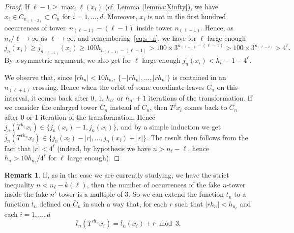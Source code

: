 \documentclass[10pt]{amsart}
\theoremstyle{definition}\newtheorem{defi}[theo]{Definition}\newtheorem{rema}[theo]{Remark}\newtheorem{exam}[theo]{Example}\newtheorem{exem}[theo]{Example}\newtheorem{nota}[theo]{Notation}
\begin{document}
\goodbreak
\begin{proof}
If $\ell-1\ge \max_i \ell(x_i)$ (cf. Lemma~\ref{lemma:Xinfty}), we have $x_i\in C_{n_{(\ell-2)}} \subset C_n$ for $i=1,\ldots,d$. Moreover, $x_i$ is not in the first hundred occurrences of tower~$n_{(\ell-1)}-(\ell-1)$ inside tower $n_{(\ell-1)}$. Hence, as $n_\ell/\ell\to\infty$ as $\ell\to\infty$, and remembering~\eqref{eq:s_n}, we have for $\ell$ large enough
\[
j_n(x_i) \ge j_{n_{(\ell-1)}}(x_i) \ge 100 h_{n_{(\ell-1)}-(\ell-1)} > 100\times 3^{n_{(\ell-1)}-(\ell-1)} > 100\times 3^{n_{(\ell-2)}} > 4^\ell.
\]
By a symmetric argument, we also get for $\ell$ large enough $j_n(x_i)<h_n-1-4^\ell$.

We observe that, since $|rh_n|<10 h_{n_\ell}$, $\{-|rh_n|,\ldots,|rh_n|\}$ is contained in an $n_{(\ell+1)}$-crossing. Hence when the orbit of some coordinate leaves $C_n$ on this interval, it comes back after 0, 1, $h_{n'}$ or $h_{n'}+1$ iterations of the transformation. If we consider the enlarged tower $\overline{C}_n$ instead of $C_n$, then $T^jx_i$ comes back to $\overline{C}_n$ after 0 or 1 iteration of the transformation. Hence $\overline{j}_n \left(T^{h_n} x_i \right)\in \{j_n(x_i)-1, j_n(x_i)\}$, and by a simple induction we get $\overline{j}_n \left(T^{rh_n} x_i \right)\in \{j_n(x_i)-|r|,\ldots, j_n(x_i)+|r|\}$. The result then follows from the fact that $|r|<4^{\ell}$ (indeed, by hypothesis we have $n>n_\ell-\ell$, hence $h_n>10 h_{n_\ell}/4^\ell$ for $\ell$ large enough).
\end{proof}

\begin{rema}\label{remark:fake-t_n}
If, as in the case we are currently studying, we have the strict inequality $n< n_\ell-k(\ell)$, then the number of occurrences of the fake $n$-tower inside the fake $n'$-tower is a multiple of 3. So we can extend the function $t_n$ to a function $\overline{t}_n$ defined on $\overline{C}_n$ in such a way that, for each $r$ such that $|rh_n|<h_{n_\ell}$ and each $i=1,\ldots,d$
\[
\overline{t}_n \left(T^{rh_n} x_i\right) = \overline{t}_n (x_i) + r \bmod 3.
\]
\end{rema}
\end{document}

